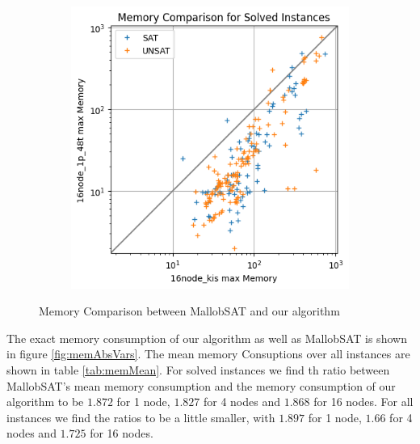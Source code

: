 \documentclass[12pt,a4paper,twoside]{scrartcl}
\numberwithin{equation}{section}
\begin{document}
\begin{figure}
\begin{subfigure}[c]{.4\textwidth}
    \label{fig:memCompare4node}
  \end{subfigure}
  \begin{subfigure}[c]{.4\textwidth}
    \center
    \includegraphics[scale=.5]{plots/square_mem_compare/square_mem_16node.png}
    \label{fig:memCompare16node}
  \end{subfigure}
  \caption{Memory Comparison between MallobSAT and our algorithm}
  \label{fig:memCompare}
\end{figure}

The exact memory consumption of our algorithm as well as MallobSAT is shown in figure \ref{fig:memAbsVars}. The mean memory Consuptions over all instances are shown in table \ref{tab:memMean}. For solved instances we find th ratio between MallobSAT's mean memory consumption and the memory consumption of our algorithm to be $1.872$ for 1 node, $1.827$ for 4 nodes and $1.868$ for 16 nodes. For all instances we find the ratios to be a little smaller, with $1.897$ for 1 node, $1.66$ for 4 nodes and $1.725$ for 16 nodes.
\end{document}
